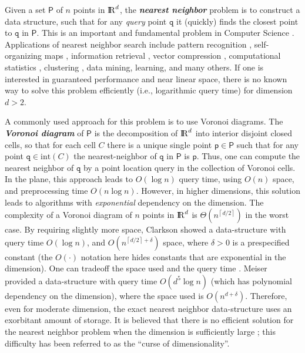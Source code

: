 \documentclass[12pt]{article}
\newcommand{\emphic}[2]{\textcolor{blue25}{\textbf{\emph{#1}}}\index{#2}}
\newcommand{\emphi}[1]{\emphic{#1}{#1}}
\theoremstyle{remark}{\theorembodyfont{\rm} \newtheorem{remark}[theorem]{Remark}}
\newcommand{\pth}[2][\!]{#1\left({#2}\right)}
\newcommand{\ceiling}[1]{\left \lceil {#1} \right \rceil}
\newcommand{\order}[1]{O\pth{#1}}
\newcommand{\ordereq}[1]{\Theta \left ( {#1} \right )}
\renewcommand{\Re}{{\rm I\!\hspace{-0.025em} R}}
\newcommand{\PntSet}{\mathsf{P}}
\newcommand{\query}{\mathtt{q}}
\newcommand{\pnt} {\mathsf{p}}
\begin{document}
Given a set $\PntSet$ of $n$ points in $\Re^d$, the \emphi{nearest
   neighbor} problem is to construct a data structure, such that for
any \emph{query} point $\query$ it (quickly) finds the closest point
to $\query$ in $\PntSet$.  This is an important and fundamental
problem in Computer Science \cite{sdi-nnmlv-06, c-tpfgn-08,
   ai-nohaa-08, c-nnsms-06}. Applications of nearest neighbor search
include pattern recognition \cite{fh-dandc-49, ch-nnpc-67},
self-organizing maps \cite{k-som-01}, information retrieval
\cite{swy-vsmai-75}, vector compression \cite{gg-vqsc-91},
computational statistics \cite{dw-nnmd-82}, clustering
\cite{dhs-pc-01}, data mining, learning, and many others.  If one is
interested in guaranteed performance and near linear space, there is
no known way to solve this problem efficiently (i.e., logarithmic
query time) for dimension $d > 2$.

A commonly used approach for this problem is to use Voronoi
diagrams. The \emphi{Voronoi diagram} of $\PntSet$ is the
decomposition of $\Re^d$ into interior disjoint closed cells, so that
for each cell $C$ there is a unique single point $\pnt \in \PntSet$
such that for any point $\query \in \mathrm{int}\pth{C}$ the
nearest-neighbor of $\query$ in $\PntSet$ is $\pnt$.  Thus, one can
compute the nearest neighbor of $\query$ by a point location query in
the collection of Voronoi cells.  In the plane, this approach leads to
$O(\log n)$ query time, using $O(n)$ space, and preprocessing time
$O(n \log n)$.  However, in higher dimensions, this solution leads to
algorithms with \emph{exponential} dependency on the dimension. The
complexity of a Voronoi diagram of $n$ points in $\Re^d$ is
$\ordereq{n^{\ceiling{d/2}}}$ in the worst case.  By requiring
slightly more space, Clarkson \cite{c-racpq-88} showed a
data-structure with query time $\order{\log n }$, and
$\order{n^{\ceiling{d/2} + \delta}}$ space, where $\delta > 0$ is a
prespecified constant (the $O(\cdot)$ notation here hides constants
that are exponential in the dimension). One can tradeoff the space
used and the query time \cite{am-rsps-93}. Meiser \cite{m-plah-93}
provided a data-structure with query time $\order{d^5 \log n }$ (which
has polynomial dependency on the dimension), where the space used is
$\order{ n^{ d + \delta}}$.  Therefore, even for moderate dimension,
the exact nearest neighbor data-structure uses an exorbitant amount of
storage.  It is believed that there is no efficient solution for the
nearest neighbor problem when the dimension is sufficiently large
\cite{mp-p-69}; this difficulty has been referred to as the ``curse of
dimensionality''.
\end{document}
